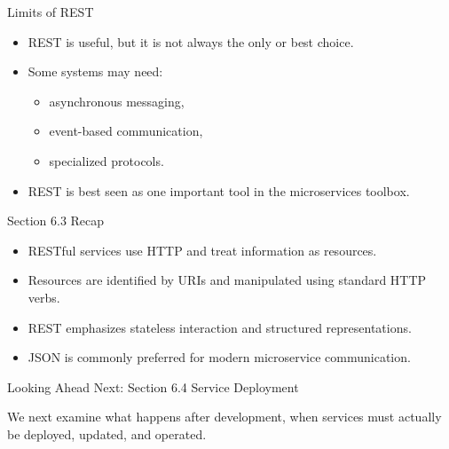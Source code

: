 \begin{frame}{Limits of REST}
\begin{itemize}
    \item REST is useful, but it is not always the only or best choice.
    \item Some systems may need:
    \begin{itemize}
        \item asynchronous messaging,
        \item event-based communication,
        \item specialized protocols.
    \end{itemize}
    \item REST is best seen as one important tool in the microservices toolbox.
\end{itemize}
\end{frame}

\begin{frame}{Section 6.3 Recap}
\begin{itemize}
    \item RESTful services use HTTP and treat information as resources.
    \item Resources are identified by URIs and manipulated using standard HTTP verbs.
    \item REST emphasizes stateless interaction and structured representations.
    \item JSON is commonly preferred for modern microservice communication.
\end{itemize}
\end{frame}

\begin{frame}{Looking Ahead}
\centering
\Large Next: Section 6.4 Service Deployment

\vspace{1em}

\normalsize
We next examine what happens after development, when services must actually be deployed, updated, and operated.
\end{frame}

